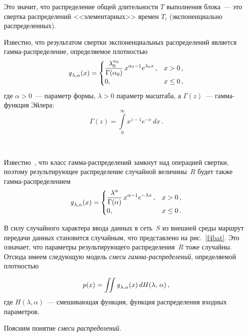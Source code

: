 \begin{multicols}{2}
Это значит, что распределение общей длительности $T$ выполнения
блока~--- это свертка распределений <<элементарных>> времен $T_i$
(экспоненциально распределенных).

Известно, что результатом свертки экспоненциальных распределений
является гамма-распределение, определяемое плотностью
$$
\mbox{\textit{g}}_{\lambda , \alpha} (x) =
\begin{cases}
\displaystyle\frac{\displaystyle \lambda_0^{\alpha_0}\mathstrut}{\displaystyle \Gamma (\alpha_0 )\mathstrut}\,x^{\alpha_0-1}
e^{\lambda_0 x}\,, & x>0\,,\\
0,\, & x\leq 0\,,
\end{cases}
$$
где $\alpha >0$~--- параметр формы,  $\lambda >0$  параметр масштаба, а
$\Gamma (z)$~--- гамма-функция Эйлера:
$$
\Gamma (z) = \int\limits_0^\infty x^{z-1} e^{-x}\,dx\,.
$$

\begin{figure*} %
\vspace*{1pt}
\begin{center}
\mbox{%
\epsfxsize=120.831mm
}
\end{center}
\vspace*{-9pt}
\end{figure*}

Известно~\cite{2bat}, что класс гамма-распределений замкнут над операцией
свертки, поэтому ре\-зуль\-ти\-ру\-ющее распределение случайной величины~$R$
будет также гамма-распределением
$$
\mbox{\textit{g}}_{\lambda , \alpha} (x) =
\begin{cases}
\displaystyle\frac{\displaystyle \lambda^{\alpha}\mathstrut}{\displaystyle \Gamma (\alpha )\mathstrut}\,x^{\alpha -1} e^{-\lambda x}\,, &
x>0\,,\\
0,\, & x\leq 0\,.
\end{cases}
$$

В силу случайного характера ввода данных в сеть~$S$ из внешней среды маршрут
передачи данных становится случайным, что представлено на рис.~\ref{f4bat}. Это
означает, что параметры ре\-зуль\-ти\-ру\-юще\-го распределения~$R$ тоже
случайны. Отсюда имеем следующую модель \textit{смеси
гам\-ма-рас\-пре\-де\-ле\-ний}, определяемой плотностью

\begin{equation} %
p(x) = \iint \g_{\lambda , \alpha}(x)\,dH (\lambda ,\,\alpha )\,,
\end{equation}
где $H(\lambda , \alpha )$~--- смешивающая функция, функция распределения
входных параметров.

Поясним понятие \textit{смеси распределений}.


\end{multicols}
